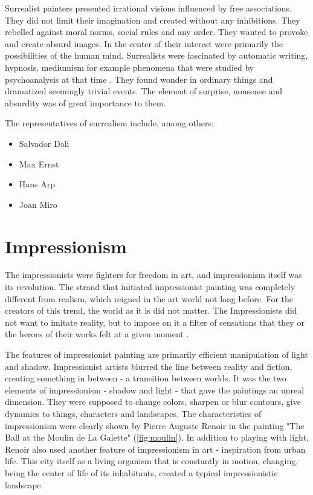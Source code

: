 \documentclass{report}
\begin{document}
Surrealist painters presented irrational visions influenced by free associations. They did not limit their imagination and created without any inhibitions. They rebelled against moral norms, social rules and any order. They wanted to provoke and create absurd images. In the center of their interest were primarily the possibilities of the human mind. Surrealists were fascinated by automatic writing, hypnosis, mediumism for example phenomena that were studied by psychoanalysis at that time \cite{BOOK:2}. They found wonder in ordinary things and dramatized seemingly trivial events. The element of surprise, nonsense and absurdity was of great importance to them.\medskip

The representatives of surrealism include, among others:
\begin{itemize}
 \item{Salvador Dali}
 \item{Max Ernst}
 \item{Hans Arp}
 \item{Joan Miro}
\end{itemize}


\section{Impressionism}

The impressionists were fighters for freedom in art, and impressionism itself was its revolution. The strand that initiated impressionist painting was completely different from realism, which reigned in the art world not long before. For the creators of this trend, the world as it is did not matter. The Impressionists did not want to imitate reality, but to impose on it a filter of sensations that they or the heroes of their works felt at a given moment \cite{BOOK:3}.

The features of impressionist painting are primarily efficient manipulation of light and shadow. Impressionist artists blurred the line between reality and fiction, creating something in between - a transition between worlds. It was the two elements of impressionism - shadow and light - that gave the paintings an unreal dimension. They were supposed to change colors, sharpen or blur contours, give dynamics to things, characters and landscapes. The characteristics of impressionism were clearly shown by Pierre Auguste Renoir in the painting "The Ball at the Moulin de La Galette" (\autoref{fig:moulin}). In addition to playing with light, Renoir also used another feature of impressionism in art - inspiration from urban life. This city itself as a living organism that is constantly in motion, changing, being the center of life of its inhabitants, created a typical impressionistic landscape.
\end{document}
